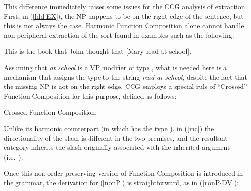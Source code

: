\documentclass[output=paper,biblatex,babelshorthands,newtxmath,draftmode,colorlinks,citecolor=brown]{langscibook}
\begin{document}
This difference immediately raises some issues for the CCG analysis of
extraction. First, in (\ref{ldd-EX}), the NP  happens to be on the right
edge of the sentence, but this is not always the  case. Harmonic
Function Composition alone cannot  handle non-peripheral
extraction of the sort found in examples such as the following:

\begin{exe}
 \ex\label{nonP}
  This is the book that John thought that [Mary read {\trace}\xspace at school].
\end{exe}
Assuming that  \textit{at school} is a VP modifier of type ,
what is needed here is a mechanism that assigns the type 
to the string \textit{read {\trace}\xspace at school}, despite the
fact that  the missing NP is not  
on the right edge. CCG employs a special  rule of ``Crossed'' Function
Composition for this purpose, defined as follows:

\begin{exe}
 \ex\label{mc}
Crossed Function Composition:\\[.5\baselineskip]
\attop{\begin{prooftree}
\hypo{\LexEnt{\pt{\ptv{a}}}{\sem{ \sG}}{\syncat{\textit{A}\ensuremath{/}\kern-.07em\textit{B}}}}
\hypo{\LexEnt{\pt{\ptv{b}}}{\sem{ \sF}}{\syncat{\textit{A}\ensuremath{\backslash}{}\textit{C}}}}
\infer2[xFC]{\LexEnt{\pt{\ptv{a} \ensuremath{\circ}\xspace \ptv{b}}}{\sem{ \lambda x. \sF(\sG(x))}}{\syncat{\textit{C}\ensuremath{/}\kern-.07em\textit{B}}}}
\end{prooftree}}
\end{exe}
Unlike its harmonic counterpart (in which  has the type
), in (\ref{mc})
the directionality of the slash is different 
in the two premises, and the resultant category inherits the
slash originally associated with the inherited argument 
(i.e.\ ).

Once this non-order-preserving version of Function Composition is 
introduced in the grammar, the derivation for (\ref{nonP}) is
straightforward, as in (\ref{nonP-DV}):
\end{document}
